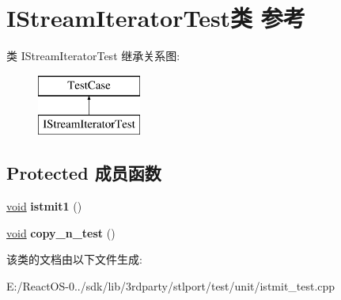 \hypertarget{class_i_stream_iterator_test}{}\section{I\+Stream\+Iterator\+Test类 参考}
\label{class_i_stream_iterator_test}
类 I\+Stream\+Iterator\+Test 继承关系图\+:\begin{figure}[H]
\begin{center}
\leavevmode
\includegraphics[height=2.000000cm]{class_i_stream_iterator_test}
\end{center}
\end{figure}
\subsection*{Protected 成员函数}
\begin{DoxyCompactItemize}
\item 
\mbox{\label{class_i_stream_iterator_test_a2512e8d35ae2ebdd5a84a5031e03515b}} 
\hyperlink{interfacevoid}{void} {\bfseries istmit1} ()
\item 
\mbox{\label{class_i_stream_iterator_test_a5d94502ae3d0fa41922960b941d0695f}} 
\hyperlink{interfacevoid}{void} {\bfseries copy\+\_\+n\+\_\+test} ()
\end{DoxyCompactItemize}


该类的文档由以下文件生成\+:\begin{DoxyCompactItemize}
\item 
E\+:/\+React\+O\+S-\/0../sdk/lib/3rdparty/stlport/test/unit/istmit\+\_\+test.\+cpp\end{DoxyCompactItemize}

